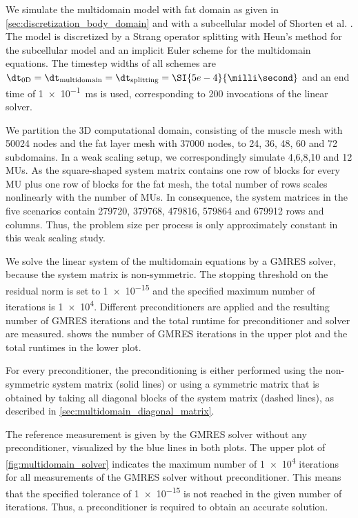 We simulate the multidomain model with fat domain as given in \cref{sec:discretization_body_domain} and with a subcellular model of Shorten et al. \cite{Shorten2007}. 
The model is discretized by a Strang operator splitting with Heun's method for the subcellular model and an implicit Euler scheme for the multidomain equations. The timestep widths of all schemes are $\dt_\text{0D}=\dt_\text{multidomain}=\dt_\text{splitting}=\SI{5e-4}{\milli\second}$ and an end time of \SI{1e-1}{\milli\second} is used, corresponding to 200 invocations of the linear solver.

We partition the 3D computational domain, consisting of the muscle mesh with \num{50024} nodes and the fat layer mesh with \num{37000} nodes, to 24, 36, 48, 60 and 72 subdomains. In a weak scaling setup, we correspondingly simulate 4,6,8,10 and 12 MUs.
As the square-shaped system matrix contains one row of blocks for every MU plus one row of blocks for the fat mesh, the total number of rows scales nonlinearly with the number of MUs. In consequence, the system matrices in the five scenarios contain \num{279720}, \num{379768}, \num{479816}, \num{579864} and \num{679912} rows and columns. Thus, the problem size per process is only approximately constant in this weak scaling study.


We solve the linear system of the multidomain equations by a GMRES solver, because the system matrix is non-symmetric.
The stopping threshold on the residual norm is set to \num{1e-15} and the specified maximum number of iterations is \num{1e4}. 
Different preconditioners are applied and the resulting number of GMRES iterations and the total runtime for preconditioner and solver are measured.
 shows the number of GMRES iterations in the upper plot and the total runtimes in the lower plot.

For every preconditioner, the preconditioning is either performed using the non-symmetric system matrix (solid lines) or using a symmetric matrix that is obtained by taking all diagonal blocks of the system matrix (dashed lines), as described in \cref{sec:multidomain_diagonal_matrix}.

The reference measurement is given by the GMRES solver without any preconditioner, visualized by the blue lines in both plots.
The upper plot of \cref{fig:multidomain_solver} indicates the maximum number of \num{1e4} iterations for all measurements of the GMRES solver without preconditioner. This means that the specified tolerance of \num{1e-15} is not reached in the given number of iterations. Thus, a preconditioner is required to obtain an accurate solution.

